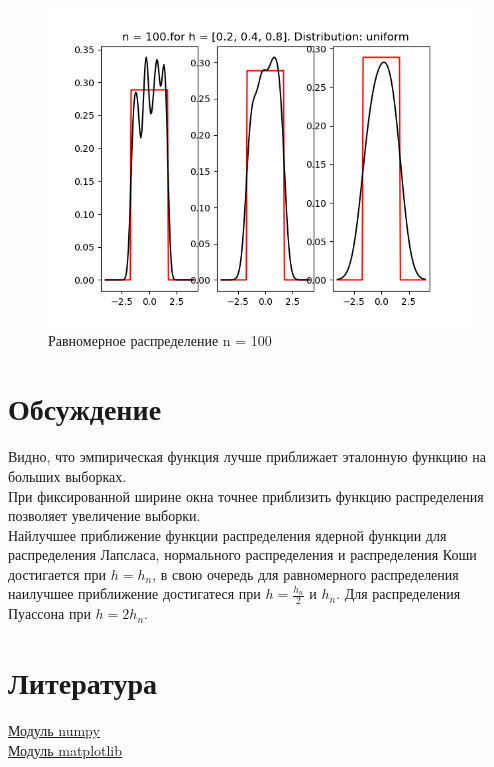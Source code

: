 \documentclass[a4]{article}
\begin{document}
\begin{center}
\begin{figure}[h!]
			\includegraphics[width=\textwidth]{uniformker100.png}
			\caption[Равномерное распределение n = 100]{Равномерное распределение n = 100}
		\end{figure}
		
	\end{center}
		
	\newpage
	\section{Обсуждение}
		Видно, что эмпирическая функция лучше приближает эталонную функцию на больших выборках.\\
		
		При фиксированной ширине окна точнее приблизить функцию распределения позволяет увеличение выборки.\\
		
		Найлучшее приближение функции распределения ядерной функции для распределения Лапсласа, нормального распределения и распределения Коши достигается при $h =  h_n$, в свою очередь для равномерного распределения наилучшее приближение достигатеся при $ h = \frac{h_n}{2}$ и $h_n$. Для распределения Пуассона при $h = 2h_n$.
	
	\section{Литература}
	
	\href{https://physics.susu.ru/vorontsov/language/numpy.html}{Модуль numpy}\\
	
	\href{https://matplotlib.org/}{Модуль matplotlib}\\
	
\end{document}
